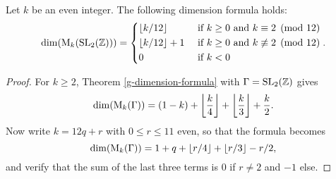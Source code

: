 \begin{cor} \label{dimension-formula}
 Let $k$ be an even integer. The following dimension formula holds:
 \[
  \dim(\mathrm{M}_k(\operatorname{SL}_2(\mathbb{Z})))=\begin{dcases}
                      \left \lfloor {k}/{12} \right\rfloor & \text{ if $k\geq 0$ and $k\equiv 2 \pmod{12}$}\\
                      \left \lfloor {k}/{12} \right\rfloor+1 & \text{ if $k\geq 0$ and $k\not\equiv 2 \pmod{12}$}\\
                      0 & \text{ if $k< 0$}
                     \end{dcases}.
 \]
\end{cor}
\begin{proof}
 For $k\geq 2$, Theorem \ref{g-dimension-formula} with $\Gamma=\operatorname{SL}_2(\mathbb{Z})$ gives
 \[\dim(\mathrm{M}_k(\Gamma))=(1-k)+\left \lfloor \frac{k}{4} \right\rfloor+\left \lfloor \frac{k}{3} \right\rfloor+\frac{k}{2}.\]
 Now write $k=12q+r$ with $0\leq r\leq 11$ even, so that the formula becomes
 \[\dim(\mathrm{M}_k(\Gamma))=1+q+\left \lfloor r/4 \right\rfloor+\left \lfloor r/3 \right\rfloor-r/2,\]
 and verify that the sum of the last three terms is $0$ if $r\neq 2$ and $-1$ else.
\end{proof}
